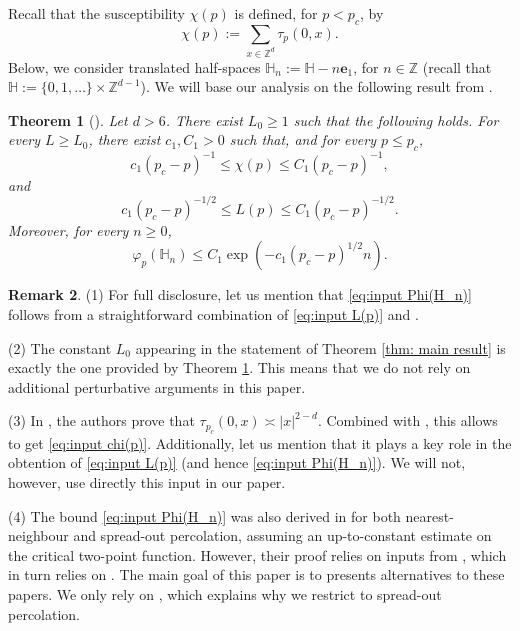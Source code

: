 \documentclass[11pt,a4paper]{article}
\numberwithin{equation}{section}
\theoremstyle{plain}
\newtheorem{Thm}{Theorem}[section]
\theoremstyle{definition}
\newtheorem{Rem}[Thm]{Remark}
\newcommand{\Z}{\mathbb{Z}}
\newcommand{\1}{\mathbf 1}
\begin{document}
	Recall that the susceptibility $\chi(p)$ is defined, for $p<p_c$, by
	\begin{equation}
		\chi(p):=\sum_{x\in \mathbb Z^d}\tau_p(0,x).
	\end{equation}
	Below, we consider translated half-spaces $\mathbb H_n:=\mathbb H-n\mathbf{e}_1$, for $n\in\Z$ (recall that $\mathbb H:=\{0,1,\ldots\}\times\mathbb Z^{d-1}$). 
	We will base our analysis on the following result from \cite{DumPan24Perco}.
	\begin{Thm}[{\hspace{1pt}\cite[Corollary~1.4]{DumPan24Perco}}]\label{thm:INPUT} Let $d>6$. There exist $L_0\geq 1$ such that the following holds. For every $L\geq L_0$, there exist $c_1,C_1>0$ such that, and for every $p\leq p_c$,
	\begin{equation}\label{eq:input chi(p)}
		c_1(p_c-p)^{-1}\leq \chi(p)\leq C_1(p_c-p)^{-1},
	\end{equation}
	and
	\begin{equation}\label{eq:input L(p)}
		c_1(p_c-p)^{-1/2}\leq L(p)\leq C_1(p_c-p)^{-1/2}.
	\end{equation}
	Moreover, for every $n\geq 0$,
	\begin{equation}\label{eq:input Phi(H_n)}
		\varphi_p(\mathbb H_n)\leq C_1\exp\left(-c_1(p_c-p)^{1/2}n\right).
	\end{equation}
	\end{Thm}
	\begin{Rem} (1) For full disclosure, let us mention that \eqref{eq:input Phi(H_n)} follows from a straightforward combination of \eqref{eq:input L(p)} and \cite[Remark~3.10]{DumPan24Perco}.
	
	(2) The constant $L_0$ appearing in the statement of Theorem \ref{thm: main result} is exactly the one provided by Theorem \ref{thm:INPUT}. This means that we do not rely on additional perturbative arguments in this paper.
	
	(3) In \cite{DumPan24Perco}, the authors prove that $\tau_{p_c}(0,x)\asymp |x|^{2-d}$. Combined with \cite{AizenmanNewmanTreeGraphInequalities1984}, this allows to get \eqref{eq:input chi(p)}. Additionally, let us mention that it plays a key role in the obtention of \eqref{eq:input L(p)} (and hence \eqref{eq:input Phi(H_n)}). We will not, however, use directly this input in our paper.
	
	(4) The bound \eqref{eq:input Phi(H_n)} was also derived in \cite{HutchcroftMichtaSladePercolationTorusPlateau2023} for both nearest-neighbour and spread-out percolation, assuming an up-to-constant estimate on the critical two-point function. However, their proof relies on inputs from \cite{ChatterjeeHanson}, which in turn relies on \cite{KozmaNachmias}. The main goal of this paper is to presents alternatives to these papers. We only rely on \cite{DumPan24Perco}, which explains why we restrict to spread-out percolation.	
	\end{Rem}
	
\end{document}
